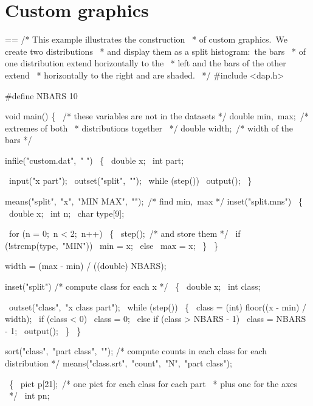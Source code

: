 \documentclass{book}
\makeatletter
\newenvironment{Texinfopreformatted}{%
  \par\GNUTobeylines\obeyspaces\frenchspacing\parskip=\z@\parindent=\z@}{}
{\catcode`\^^M=13 \gdef\GNUTobeylines{\catcode`\^^M=13 \def^^M{\null\par}}}
\newenvironment{Texinfoindented}{\begin{list}{}{}\item\relax}{\end{list}}
\renewcommand{\_}{\Texinfounderscore\discretionary{}{}{}}
\makeatother
\begin{document}
\section{{Custom graphics}}
\label{anchor:Custom-graphics}%

\begin{Texinfoindented}
\begin{Texinfopreformatted}%
\ttfamily /* This example illustrates the construction
\ * of custom graphics.\  We create two distributions
\ * and display them as a split histogram:\ the bars
\ * of one distribution extend horizontally to the
\ * left and the bars of the other extend
\ * horizontally to the right and are shaded.
\ */
\#include <dap.h>

\#define NBARS 10

void main()
\{
\ /* these variables are not in the datasets */
double min,\ max;\  /* extremes of both
\                   * distributions together
\                   */
double width;\     /* width of the bars */

infile("custom.dat",\ " ")
\  \{
\    double x;
\    int part;

\    input("x part");
\    outset("split",\ "");
\    while (step())
\      output();
\  \}

means("split",\ "x",\ "MIN MAX",\ "");\ /* find min,\ max */
inset("split.mns")
\  \{
\    double x;
\    int n;
\    char \_type\_[9];

\    for (n = 0;\ n < 2;\ n++)
\      \{
\        step();\             /* and store them */
\        if (!strcmp(\_type\_,\ "MIN"))
\          min = x;
\        else
\          max = x;
\      \}
\  \}

width = (max - min) / ((double) NBARS);

inset("split")      /* compute class for each x */
\  \{
\    double x;
\    int class;

\    outset("class",\ "x class part");
\    while (step())
\      \{
\        class = (int) floor((x - min) / width);
\        if (class < 0)
\          class = 0;
\        else if (class > NBARS - 1)
\          class = NBARS - 1;
\        output();
\      \}
\  \}

sort("class",\ "part class",\ "");
/* compute counts in each class for each distribution */
means("class.srt",\ "count",\ "N",\ "part class");

\  \{
\  pict p[21];\  /* one pict for each class for each part
\                * plus one for the axes
\                */
\  int pn;


\end{Texinfopreformatted}
\end{Texinfoindented}
\end{document}
